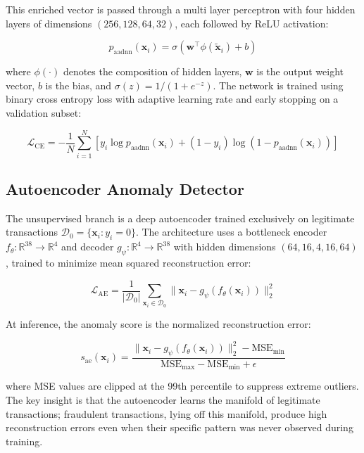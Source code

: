 \documentclass[conference]{IEEEtran}
\begin{document}
This enriched vector is passed through a multi layer perceptron with four hidden layers of dimensions $(256, 128, 64, 32)$, each followed by ReLU activation:

\begin{equation}
p_{\text{aadnn}}(\mathbf{x}_i) = \sigma\!\left(\mathbf{w}^\top \phi(\tilde{\mathbf{x}}_i) + b\right)
\label{eq:aadnn}
\end{equation}

\noindent where $\phi(\cdot)$ denotes the composition of hidden layers, $\mathbf{w}$ is the output weight vector, $b$ is the bias, and $\sigma(z) = 1/(1 + e^{-z})$. The network is trained using binary cross entropy loss with adaptive learning rate and early stopping on a validation subset:

\begin{equation}
\mathcal{L}_{\text{CE}} = -\frac{1}{N}\sum_{i=1}^{N}\!\left[y_i \log p_{\text{aadnn}}(\mathbf{x}_i) + (1 - y_i)\log(1 - p_{\text{aadnn}}(\mathbf{x}_i))\right]
\label{eq:ce}
\end{equation}

\subsection{Autoencoder Anomaly Detector}

The unsupervised branch is a deep autoencoder trained exclusively on legitimate transactions $\mathcal{D}_0 = \{\mathbf{x}_i : y_i = 0\}$. The architecture uses a bottleneck encoder $f_\theta: \mathbb{R}^{38} \to \mathbb{R}^{4}$ and decoder $g_\psi: \mathbb{R}^{4} \to \mathbb{R}^{38}$ with hidden dimensions $(64, 16, 4, 16, 64)$, trained to minimize mean squared reconstruction error:

\begin{equation}
\mathcal{L}_{\text{AE}} = \frac{1}{|\mathcal{D}_0|} \sum_{\mathbf{x}_i \in \mathcal{D}_0} \|\mathbf{x}_i - g_\psi(f_\theta(\mathbf{x}_i))\|_2^2
\label{eq:ae_loss}
\end{equation}

At inference, the anomaly score is the normalized reconstruction error:

\begin{equation}
s_{\text{ae}}(\mathbf{x}_i) = \frac{\|\mathbf{x}_i - g_\psi(f_\theta(\mathbf{x}_i))\|_2^2 - \text{MSE}_{\min}}{\text{MSE}_{\max} - \text{MSE}_{\min} + \epsilon}
\label{eq:ae_score}
\end{equation}

\noindent where MSE values are clipped at the 99th percentile to suppress extreme outliers. The key insight is that the autoencoder learns the manifold of legitimate transactions; fraudulent transactions, lying off this manifold, produce high reconstruction errors even when their specific pattern was never observed during training.
\end{document}
